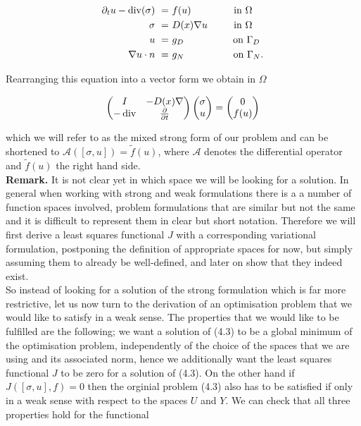 \documentclass[../draft_1.tex]{subfiles}
\begin{document}
\begin{ceqn}
	\begin{equation}
	\begin{aligned}
	\label{mixed_form}
	 \partial_t u - \mathop{}\!\mathrm{div}(\sigma) \ =& \ f(u) \qquad \qquad \text{ in } \Omega \\
	\sigma \ =& \ D(x)  \nabla u \ \qquad \text{ in } \Omega  \\
	u \ =& \ g_D  \ \ \qquad  \qquad \text{ on } \Gamma_D \\
	\nabla u \cdot n \ =& \ g_N  \ \ \qquad \qquad \text{ on } \Gamma_N.
	\end{aligned}
	\end{equation}
\end{ceqn}
Rearranging this equation into a vector form we obtain in $\Omega$
\begin{ceqn}
	\begin{equation}
	\begin{pmatrix}
	I & - D(x) \nabla \\
	- \mathop{}\!\mathrm{div} & \frac{\partial}{\partial t} 
	\end{pmatrix}
	\begin{pmatrix}
	\sigma \\
	u
	\end{pmatrix} = 
	\begin{pmatrix}
	0 \\
	f(u)
	\end{pmatrix}
	\end{equation}
\end{ceqn}
which we will refer to as the mixed strong form of our problem and can be shortened to $\mathcal{A} ([\sigma, u]) = \tilde{f}(u)$, where $\mathcal{A}$ denotes the differential operator and $\tilde{f}(u)$ the right hand side. 
\smallskip
\\
\textbf{Remark.} It is not clear yet in which space we will be looking for a solution. In general when working with strong and weak formulations there is a a number of function spaces involved, problem formulations that are similar but not the same and it is difficult to represent them in clear but short notation. Therefore we will first derive a least squares functional $J$ with a corresponding variational formulation, postponing the definition of appropriate spaces for now, but simply assuming them to already be well-defined, and later on show that they indeed exist.
\smallskip
\\
So instead of looking for a solution of the strong formulation which is far more restrictive, let us now turn to the derivation of an optimisation problem that we would like to satisfy in a weak sense. The properties that we would like to be fulfilled are the following; we want a solution of (4.3) to be a global minimum of the optimisation problem, independently of the choice of the spaces that we are using and its associated norm, hence we additionally want the least squares functional $J$ to be zero for a solution of (4.3). On the other hand if $J([\sigma, u], f) = 0$ then the orginial problem (4.3) also has to be satisfied if only in a weak sense with respect to the spaces $U$ and $Y$. We can check that all three properties hold for the functional  
\end{document}
